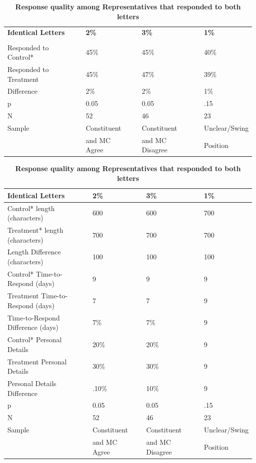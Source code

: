 \documentclass[12pt]{article}\usepackage[]{graphicx}\usepackage[]{color}
\begin{document}
\begin{table}[h!]
	\caption{\textbf{Response quality among Representatives that responded to both letters}}
\label{tab2}
\begin{tabular}{lllllll}
	\textbf{Identical Letters }   && \textbf{2\% }           &&   \textbf{3\%}   && \textbf{1\%} \\\\
	\hline
	Responded to Control*   && 45\%            &&   45\%   && 40\% \\
	Responded to Treatment &&   45\%        &&   47\%    && 39\% \\
	Difference                       && 2\%           &&   2\%   && 1\%    \\
	\hline
	p            && 0.05 				&&   0.05 &&  .15\\
	N 			 &&      52 			 &&  46    &&  23\\ 
	\hline
	Sample && Constituent   && Constituent   &&    Unclear/Swing   \\  
	&&								and MC	Agree	&& and MC Disagree               &&   Position\\ 
\end{tabular}
\end{table}

 \begin{table}[h!]
	\caption{\textbf{Response quality among Representatives that responded to both letters}}
	\label{tab2}
	\begin{tabular}{lllllll}
		\textbf{Identical Letters}   && \textbf{2\% }           &&   \textbf{3\%}   && \textbf{1\%}\\
		\hline
		Control* length (characters)   && 600            &&   600   && 700 \\
		Treatment* length  (characters) && 700            &&   700   && 700\\
		Length Difference  (characters) && 100           &&   100   && 100\\
		\hline
		Control* Time-to-Respond  (days) && 9            &&   9   && 9\\
		Treatment Time-to-Respond (days) && 7         &&   7    &&  9 \\ 
		Time-to-Respond Difference (days) && 7\%            &&   7\%   &&  9 \\ 
		\hline
		Control* Personal Details                && 20\%            &&   20\%   &&  9\\
		Treatment Personal Details                && 30\%            &&   30\%   &&  9 \\
		Personal Details Difference && .10\%                      &&  10\%   &&  9 \\
		\hline
		p            && 0.05 				&&   0.05 &&  .15\\
		N 			 &&      52 			 &&  46    &&  23\\ 
		\hline
		Sample && Constituent   && Constituent   &&    Unclear/Swing   \\  
		&&								and MC	Agree	&& and MC Disagree               &&   Position\\ 
	\end{tabular}
\end{table}
\end{document}
